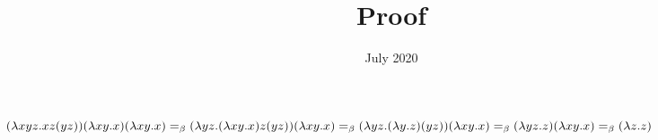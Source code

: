 \documentclass{article}
\title{Proof}
\date{July 2020}
\begin{document}
\maketitle
$(\lambda x y z.x z (y z))(\lambda x y.x)(\lambda x y.x)=_\beta
(\lambda y z.(\lambda x y.x) z (y z))(\lambda x y.x)=_\beta\\(\lambda y z.(\lambda y.z) (y z))(\lambda x y.x)=_\beta(\lambda y z.z)(\lambda x y.x)=_\beta(\lambda z.z)$
\end{document}
